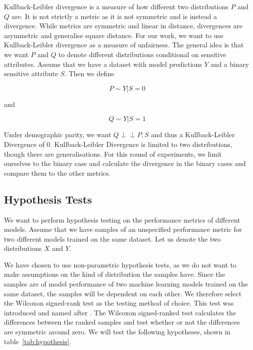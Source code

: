 Kullback-Leibler divergence is a measure of how different two distributions $P$ and $Q$ are. It is not strictly a metric as it is not symmetric and is instead a divergence. While metrics are symmetric and linear in distance, divergences are asymmetric and generalise square distance. For our work, we want to use Kullback-Leibler divergence as a measure of unfairness. The general idea is that we want $P$ and $Q$ to denote different distributions conditional on sensitive attributes. Assume that we have a dataset with model predictions $Y$ and a binary sensitive attribute $S$. Then we define 

\begin{equation*}
    P \sim Y | S = 0
\end{equation*}

and

\begin{equation*}
    Q \sim Y | S = 1
\end{equation*}

Under demographic parity, we want $Q \perp\!\!\!\perp P , S$ and thus a Kullback-Leibler Divergence of 0. Kullback-Leibler Divergence is limited to two distributions, though there are generalisations. For this round of experiments, we limit ourselves to the binary case and calculate the divergence in the binary cases and compare them to the other metrics.

\subsection{Hypothesis Tests}

We want to perform hypothesis testing on the performance metrics of different models. Assume that we have samples of an unspecified performance metric for two different models trained on the same dataset. Let us denote the two distributions $X$ and $Y$. 

We have chosen to use non-parametric hypothesis tests, as we do not want to make assumptions on the kind of distribution the samples have. Since the samples are of model performance of two machine learning models trained on the same dataset, the samples will be dependent on each other. We therefore select the Wilcoxon signed-rank test as the testing method of choice. This test was introduced and named after \citet{Wilcoxon:1945:Biometrics}. The Wilcoxon signed-ranked test calculates the differences between the ranked samples and test whether or not the differences are symmetric around zero. We will test the following hypotheses, shown in table~\ref{tab:hypothesis}.

